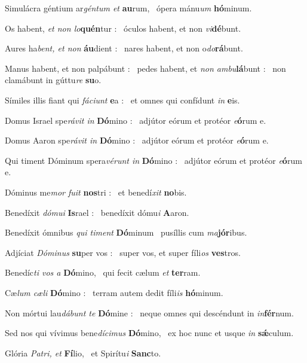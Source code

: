 \documentclass[12pt]{article} %
\newenvironment{psalmtext}{\leftskip 0.25in}{\vspace{1 mm}}
\let\oldgresixstar\gresixstar
\renewcommand{\gresixstar}{\textcolor{benred8}{\oldgresixstar}}
\let\oldgredagger\gredagger
\renewcommand{\gredagger}{\textcolor{benred8}{\oldgredagger}}
\begin{document}
\begin{pages}
\begin{Leftside}
\begin{psalmtext}
Simulácra géntium ar\emph{géntum et} \textbf{au}rum, \gresixstar\ ópera mánu\emph{um} \textbf{hó}minum.

Os habent, \emph{et non lo}\textbf{quén}tur : \gresixstar\ óculos habent, et non \emph{vi}\textbf{dé}bunt.

Aures ha\emph{bent, et non} \textbf{áu}dient : \gresixstar\ nares habent, et non o\emph{do}\textbf{rá}bunt.

Manus habent, et non palpábunt : \gredagger\ pedes habent, et \emph{non ambu}\textbf{lá}bunt : \gresixstar\ non clamábunt in gúttu\emph{re} \textbf{su}o.

Símiles illis fiant qui \emph{fáciunt} \textbf{e}a : \gresixstar\ et omnes qui confídunt \emph{in} \textbf{e}is.

Domus Israel spe\emph{rávit in} \textbf{Dó}mino : \gresixstar\ adjútor eórum et protéor \emph{e}\textbf{ó}rum e.

Domus Aaron spe\emph{rávit in} \textbf{Dó}mino : \gresixstar\ adjútor eórum et protéor \emph{e}\textbf{ó}rum e.

Qui timent Dóminum spera\emph{vérunt in} \textbf{Dó}mino : \gresixstar\ adjútor eórum et protéor \emph{e}\textbf{ó}rum e.

Dóminus me\emph{mor fuit} \textbf{nos}tri : \gresixstar\ et benedí\emph{xit} \textbf{no}bis.

Benedíxit \emph{dómui} \textbf{Is}rael : \gresixstar\ benedíxit dómu\emph{i} \textbf{A}aron.

Benedíxit ómnibus \emph{qui timent} \textbf{Dó}minum \gresixstar\ pusíllis cum \emph{ma}\textbf{jór}ibus.

Adjíciat \emph{Dóminus} \textbf{su}per vos : \gresixstar\ super vos, et super fíli\emph{os} \textbf{ves}tros.

Benedíc\emph{ti vos a} \textbf{Dó}mino, \gresixstar\ qui fecit cælum \emph{et} \textbf{ter}ram.

Cæ\emph{lum cæli} \textbf{Dó}mino : \gresixstar\ terram autem dedit fíli\emph{is} \textbf{hó}minum.

Non mórtui lau\emph{dábunt te} \textbf{Dó}mine : \gresixstar\ neque omnes qui descéndunt in \emph{in}\textbf{fér}num.

Sed nos qui vívimus bene\emph{dícimus} \textbf{Dó}mino, \gresixstar\ ex hoc nunc et usque \emph{in} \textbf{sǽ}culum.

Glória \emph{Patri, et} \textbf{Fí}lio, \gresixstar\ et Spirítu\emph{i} \textbf{Sanc}to.


\end{psalmtext}
\end{Leftside}
\end{pages}
\end{document}
